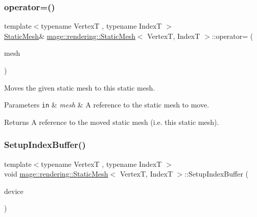 \subsubsection{\texorpdfstring{operator=()}{operator=()}\hspace{0.1cm}{\footnotesize\ttfamily [2/2]}}
{\footnotesize\ttfamily template$<$typename VertexT , typename IndexT $>$ \\
\mbox{\hyperlink{classmage_1_1rendering_1_1_static_mesh}{Static\+Mesh}}\& \mbox{\hyperlink{classmage_1_1rendering_1_1_static_mesh}{mage\+::rendering\+::\+Static\+Mesh}}$<$ VertexT, IndexT $>$\+::operator= (\begin{DoxyParamCaption}\item[{\mbox{\hyperlink{classmage_1_1rendering_1_1_static_mesh}{Static\+Mesh}}$<$ VertexT, IndexT $>$ \&\&}]{mesh }\end{DoxyParamCaption})\hspace{0.3cm}{\ttfamily [noexcept]}}

Moves the given static mesh to this static mesh.


\begin{DoxyParams}[1]{Parameters}
\mbox{\tt in}  & {\em mesh} & A reference to the static mesh to move. \\
\hline
\end{DoxyParams}
\begin{DoxyReturn}{Returns}
A reference to the moved static mesh (i.\+e. this static mesh). 
\end{DoxyReturn}
\mbox{\label{classmage_1_1rendering_1_1_static_mesh_acd815df7e87dde687613e3f4d5acc564}} 
\subsubsection{\texorpdfstring{Setup\+Index\+Buffer()}{SetupIndexBuffer()}}
{\footnotesize\ttfamily template$<$typename VertexT , typename IndexT $>$ \\
void \mbox{\hyperlink{classmage_1_1rendering_1_1_static_mesh}{mage\+::rendering\+::\+Static\+Mesh}}$<$ VertexT, IndexT $>$\+::Setup\+Index\+Buffer (\begin{DoxyParamCaption}\item[{I\+D3\+D11\+Device \&}]{device }\end{DoxyParamCaption})\hspace{0.3cm}{\ttfamily [private]}}

